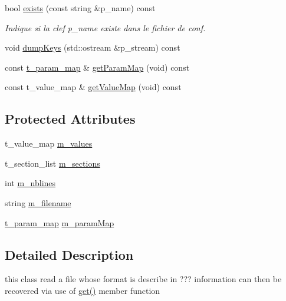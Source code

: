 \begin{DoxyCompactItemize}
bool \hyperlink{classxtd_1_1ConfParser_a7f1323a9ef1f85c73a0bff383e24967c}{exists} (const string \&p\+\_\+name) const 
\begin{DoxyCompactList}\small\item\em Indique si la clef p\+\_\+name existe dans le fichier de conf. \end{DoxyCompactList}\item 
void \hyperlink{classxtd_1_1ConfParser_ae7e7ade9440517b79cc22f21b10df7a5}{dump\+Keys} (std\+::ostream \&p\+\_\+stream) const 
\item 
const \hyperlink{classxtd_1_1ConfParser_a715a3e39fd796046c94546e60f22414d}{t\+\_\+param\+\_\+map} \& \hyperlink{classxtd_1_1ConfParser_a1be1c2813abf959d85bb6cf695c74dec}{get\+Param\+Map} (void) const 
\item 
const t\+\_\+value\+\_\+map \& \hyperlink{classxtd_1_1ConfParser_a34d7366228341b5501bfec94607dd396}{get\+Value\+Map} (void) const 
\end{DoxyCompactItemize}
\subsection*{Protected Attributes}
\begin{DoxyCompactItemize}
\item 
t\+\_\+value\+\_\+map \hyperlink{classxtd_1_1ConfParser_a4c58cc4fa96ebaddd180a0c67edb481f}{m\+\_\+values}
\item 
t\+\_\+section\+\_\+list \hyperlink{classxtd_1_1ConfParser_a100cffb5f33795e50c87ab5fb2a43963}{m\+\_\+sections}
\item 
int \hyperlink{classxtd_1_1ConfParser_a5203f3b8cb6e9070b33371c9acabbc8c}{m\+\_\+nblines}
\item 
string \hyperlink{classxtd_1_1ConfParser_abc9e0b073f91de77b76db39bfbc27508}{m\+\_\+filename}
\item 
\hyperlink{classxtd_1_1ConfParser_a715a3e39fd796046c94546e60f22414d}{t\+\_\+param\+\_\+map} \hyperlink{classxtd_1_1ConfParser_abe309999c7964603bde870c7bda16d2e}{m\+\_\+param\+Map}
\end{DoxyCompactItemize}


\subsection{Detailed Description}
this class read a file whose format is describe in ??? information can then be recovered via use of \hyperlink{classxtd_1_1ConfParser_a5ef18d8778c844ce60f2c93579be7926}{get()} member function 

